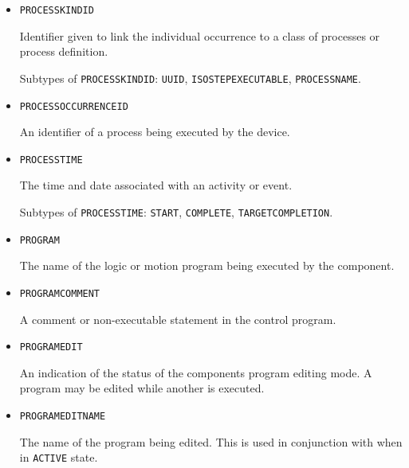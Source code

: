 \begin{itemize}
Identifier given to link the individual occurrence to a group of related occurrences, such as a process step in a process plan.

Subtypes of \texttt{PROCESS\textunderscore AGGREGATE\textunderscore ID}: \texttt{ORDER\textunderscore NUMBER}, \texttt{PROCESS\textunderscore STEP}, \texttt{PROCESS\textunderscore PLAN}.

\item \texttt{PROCESS\textunderscore KIND\textunderscore ID}  

Identifier given to link the individual occurrence to a class of processes or process definition.


Subtypes of \texttt{PROCESS\textunderscore KIND\textunderscore ID}: \texttt{UUID}, \texttt{ISO\textunderscore STEP\textunderscore EXECUTABLE}, \texttt{PROCESS\textunderscore NAME}.

\item \texttt{PROCESS\textunderscore OCCURRENCE\textunderscore ID}  

An identifier of a process being executed by the device.


\item \texttt{PROCESS\textunderscore TIME}  

The time and date associated with an activity or event.

Subtypes of \texttt{PROCESS\textunderscore TIME}: \texttt{START}, \texttt{COMPLETE}, \texttt{TARGET\textunderscore COMPLETION}.

\item \texttt{PROGRAM}  

The name of the logic or motion program being executed by the  component.


\item \texttt{PROGRAM\textunderscore COMMENT}  

A comment or non-executable statement in the control program.


\item \texttt{PROGRAM\textunderscore EDIT}  

An indication of the status of the  components program editing mode. A program may be edited while another is executed.


\item \texttt{PROGRAM\textunderscore EDIT\textunderscore NAME}  

The name of the program being edited. 
 This is used in conjunction with  when in \texttt{ACTIVE} state. 



\end{itemize}
